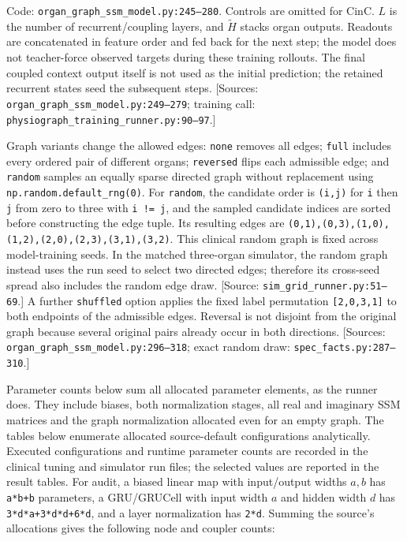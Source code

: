 Code: \texttt{organ\_\allowbreak{}graph\_\allowbreak{}ssm\_\allowbreak{}model.\allowbreak{}py:\allowbreak{}245–\allowbreak{}280}. Controls are omitted for CinC. \(L\) is the number of recurrent/coupling layers, and \(\widetilde H\) stacks organ outputs. Readouts are concatenated in feature order and fed back for the next step; the model does not teacher-force observed targets during these training rollouts. The final coupled context output itself is not used as the initial prediction; the retained recurrent states seed the subsequent steps. [Sources: \texttt{organ\_\allowbreak{}graph\_\allowbreak{}ssm\_\allowbreak{}model.\allowbreak{}py:\allowbreak{}249–\allowbreak{}279}; training call: \texttt{physiograph\_\allowbreak{}training\_\allowbreak{}runner.\allowbreak{}py:\allowbreak{}90–\allowbreak{}97}.]

Graph variants change the allowed edges: \texttt{none} removes all edges; \texttt{full} includes every ordered pair of different organs; \texttt{reversed} flips each admissible edge; and \texttt{random} samples an equally sparse directed graph without replacement using \texttt{np.\allowbreak{}random.\allowbreak{}default\_\allowbreak{}rng(0)}. For \texttt{random}, the candidate order is \texttt{(i,\allowbreak{}j)} for \texttt{i} then \texttt{j} from zero to three with \texttt{i !=\allowbreak{} j}, and the sampled candidate indices are sorted before constructing the edge tuple. Its resulting edges are \texttt{(0,\allowbreak{}1),\allowbreak{}(0,\allowbreak{}3),\allowbreak{}(1,\allowbreak{}0),\allowbreak{}(1,\allowbreak{}2),\allowbreak{}(2,\allowbreak{}0),\allowbreak{}(2,\allowbreak{}3),\allowbreak{}(3,\allowbreak{}1),\allowbreak{}(3,\allowbreak{}2)}. This clinical random graph is fixed across model-training seeds. In the matched three-organ simulator, the random graph instead uses the run seed to select two directed edges; therefore its cross-seed spread also includes the random edge draw. [Source: \texttt{sim\_grid\_runner.py:51--69}.] A further \texttt{shuffled} option applies the fixed label permutation \texttt{[2,\allowbreak{}0,\allowbreak{}3,\allowbreak{}1]} to both endpoints of the admissible edges. Reversal is not disjoint from the original graph because several original pairs already occur in both directions. [Sources: \texttt{organ\_\allowbreak{}graph\_\allowbreak{}ssm\_\allowbreak{}model.\allowbreak{}py:\allowbreak{}296–\allowbreak{}318}; exact random draw: \texttt{spec\_\allowbreak{}facts.\allowbreak{}py:\allowbreak{}287–\allowbreak{}310}.]

Parameter counts below sum all allocated parameter elements, as the runner does. They include biases, both normalization stages, all real and imaginary SSM matrices and the graph normalization allocated even for an empty graph. The tables below enumerate allocated source-default configurations analytically. Executed configurations and runtime parameter counts are recorded in the clinical tuning and simulator run files; the selected values are reported in the result tables. For audit, a biased linear map with input/output widths \(a,b\) has \texttt{a*b+b} parameters, a GRU/GRUCell with input width \(a\) and hidden width \(d\) has \texttt{3*d*a+3*d*d+6*d}, and a layer normalization has \texttt{2*d}. Summing the source's allocations gives the following node and coupler counts:

